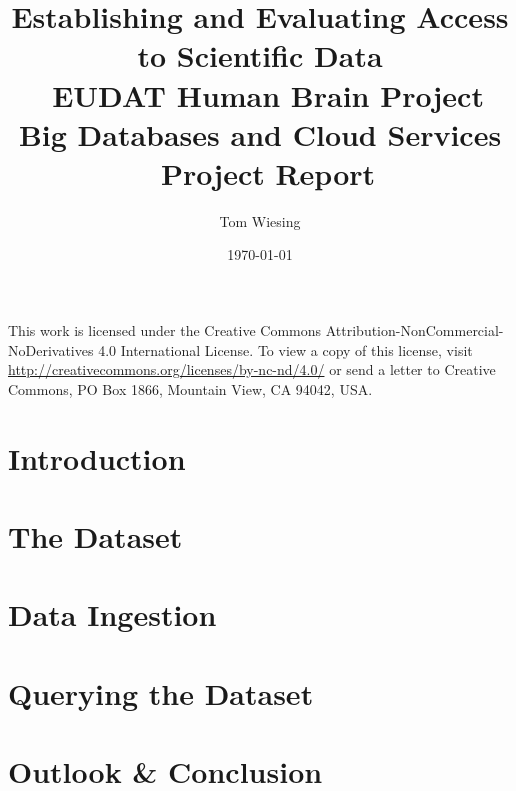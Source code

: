 \documentclass{article}
\title{Establishing and Evaluating Access to Scientific Data \\ EUDAT Human Brain Project \\ Big Databases and Cloud Services \\ Project Report}
\author{Tom Wiesing}
\date{\today}
\begin{document}
	
	\maketitle
	

	\newpage
	
	\tableofcontents
	
	
	\vspace{\fill}\noindent	
	This work is licensed under the Creative Commons Attribution-NonCommercial-NoDerivatives 4.0 International License. To view a copy of this license, visit \url{http://creativecommons.org/licenses/by-nc-nd/4.0/} or send a letter to Creative Commons, PO Box 1866, Mountain View, CA 94042, USA. 
	\newpage
	
	\section{Introduction}
	
	\newpage
	
	\section{The Dataset}
	
	\newpage
	
	\section{Data Ingestion}
	
	
	\section{Querying the Dataset}
	
		
	\section{Outlook \& Conclusion}
	
	
	\printbibliography
\end{document}

